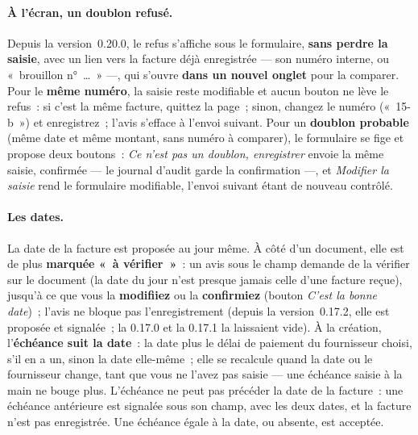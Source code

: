 \documentclass[a4paper,11pt,oneside]{article}
\begin{document}
\paragraph{À l'écran, un doublon refusé.} Depuis la version~0.20.0, le refus s'affiche sous le
formulaire, \textbf{sans perdre la saisie}, avec un lien vers la facture déjà enregistrée --- son
numéro interne, ou «~brouillon n°~\ldots~» ---, qui s'ouvre \textbf{dans un nouvel onglet} pour
la comparer. Pour le \textbf{même numéro}, la saisie reste modifiable et aucun bouton ne lève le
refus~: si c'est la même facture, quittez la page~; sinon, changez le numéro («~15-b~») et
enregistrez~; l'avis s'efface à l'envoi suivant. Pour un \textbf{doublon probable} (même date et
même montant, sans numéro à comparer), le formulaire se fige et propose deux boutons~:
\emph{Ce n'est pas un doublon, enregistrer} envoie la même saisie, confirmée --- le journal
d'audit garde la confirmation ---, et \emph{Modifier la saisie} rend le formulaire modifiable,
l'envoi suivant étant de nouveau contrôlé.

\paragraph{Les dates.} La date de la facture est proposée au jour même. À côté d'un document,
elle est de plus \textbf{marquée «~à vérifier~»}~: un avis sous le champ demande de la vérifier sur
le document (la date du jour n'est presque jamais celle d'une facture reçue), jusqu'à ce que vous la \textbf{modifiiez} ou
la \textbf{confirmiez} (bouton \emph{C'est la bonne date})~; l'avis ne bloque pas
l'enregistrement (depuis la version~0.17.2, elle est proposée et signalée~; la 0.17.0 et la 0.17.1
la laissaient vide). À la création, l'\textbf{échéance suit la date}~: la date plus le délai de
paiement du fournisseur choisi, s'il en a un, sinon la date elle-même~; elle se recalcule quand la
date ou le fournisseur change, tant que vous ne l'avez pas saisie --- une échéance saisie à la main
ne bouge plus. L'échéance ne peut pas précéder la date de la facture~: une échéance antérieure est
signalée sous son champ, avec les deux dates, et la facture n'est pas enregistrée. Une échéance
égale à la date, ou absente, est acceptée.
\end{document}
